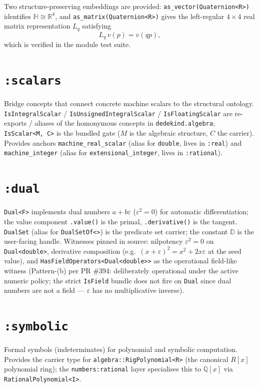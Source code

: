 \documentclass[11pt, a4paper]{report}
\begin{document}
Two structure-preserving embeddings are provided:
\texttt{as\_vector(Quaternion<R>)} identifies $\mathbb{H}\cong\mathbb{R}^4$, and
\texttt{as\_matrix(Quaternion<R>)} gives the left-regular $4\times4$ real matrix
representation $L_q$ satisfying
\[
L_q\,v(p)=v(qp),
\]
which is verified in the module test suite.

\section{\texttt{:scalars}}
\label{sec:numbers-scalars}

Bridge concepts that connect concrete machine scalars to the structural ontology. \texttt{IsIntegralScalar} / \texttt{IsUnsignedIntegralScalar} / \texttt{IsFloatingScalar} are re-exports / aliases of the homonymous concepts in \texttt{dedekind.algebra}; \texttt{IsScalar<M, C>} is the bundled gate ($M$ is the algebraic structure, $C$ the carrier). Provides anchors \texttt{machine\_real\_scalar} (alias for \texttt{double}, lives in \texttt{:real}) and \texttt{machine\_integer} (alias for \texttt{extensional\_integer}, lives in \texttt{:rational}).

\section{\texttt{:dual}}
\label{sec:numbers-dual}

\texttt{Dual<F>} implements dual numbers $a + b\varepsilon$ ($\varepsilon^2 = 0$) for automatic differentiation; the value component \texttt{.value()} is the primal, \texttt{.derivative()} is the tangent. \texttt{DualSet} (alias for \texttt{DualSetOf<>}) is the predicate set carrier; the constant $\mathbb{D}$ is the user-facing handle. Witnesses pinned in source: nilpotency $\varepsilon^2 = 0$ on \texttt{Dual<double>}, derivative composition (e.g.\ $(x + \varepsilon)^2 = x^2 + 2x\varepsilon$ at the seed value), and \texttt{HasFieldOperators<Dual<double>>} as the operational field-like witness (Pattern-(b) per PR \#394: deliberately operational under the active numeric policy; the strict \texttt{IsField} bundle does not fire on \texttt{Dual} since dual numbers are not a field --- $\varepsilon$ has no multiplicative inverse).

\section{\texttt{:symbolic}}
\label{sec:numbers-symbolic}

Formal symbols (indeterminates) for polynomial and symbolic computation. Provides the carrier type for \texttt{algebra::RigPolynomial<R>} (the canonical $R[x]$ polynomial ring); the \texttt{numbers:rational} layer specialises this to $\mathbb{Q}[x]$ via \texttt{RationalPolynomial<I>}.
\end{document}
